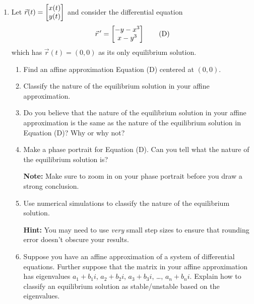 \begin{enumerate}
	\item Let $\vec r(t)=\begin{bmatrix}x(t)\\y(t)\end{bmatrix}$ and consider the differential equation
	      \begin{equation}
		      \vec r\,' = \begin{bmatrix}-y-x^3\\x-y^3\end{bmatrix} \tag{D}
	      \end{equation}
	      which has $\vec r(t)=(0,0)$ as its only equilibrium solution.
	      \begin{enumerate}
		      \item Find an affine approximation Equation (D) centered at $(0,0)$.
		      \item Classify the nature of the equilibrium solution in your affine approximation.
		      \item Do you believe that the nature of the equilibrium solution in your affine approximation
		            is the same as the nature of the equilibrium solution in Equation (D)? Why or why not?
		      \item Make a phase portrait for Equation (D). Can you tell what the nature of the equilibrium solution is?

		            \textbf{Note:} Make sure to zoom in on your phase portrait before you draw a strong conclusion.
		      \item Use numerical simulations to classify the nature of the equilibrium solution.

		            \textbf{Hint:} You may need to use \emph{very} small step sizes to ensure that rounding error
		            doesn't obscure your results.


		      \item Suppose you have an affine approximation of a system of differential equations. Further suppose
		            that the matrix in your affine approximation has eigenvalues $a_1+b_1i$, $a_2+b_2i$, $a_3+b_3i$, \ldots, $a_n+b_ni$.
		            Explain how to classify an equilibrium solution as stable/unstable based on the eigenvalues.

	      \end{enumerate}
\end{enumerate}